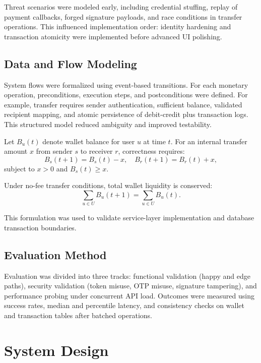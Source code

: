 \documentclass[conference]{IEEEtran}
\begin{document}
Threat scenarios were modeled early, including credential stuffing, replay of payment callbacks, forged signature payloads, and race conditions in transfer operations. This influenced implementation order: identity hardening and transaction atomicity were implemented before advanced UI polishing.

\subsection{Data and Flow Modeling}
System flows were formalized using event-based transitions. For each monetary operation, preconditions, execution steps, and postconditions were defined. For example, transfer requires sender authentication, sufficient balance, validated recipient mapping, and atomic persistence of debit-credit plus transaction logs. This structured model reduced ambiguity and improved testability.

Let $B_u(t)$ denote wallet balance for user $u$ at time $t$. For an internal transfer amount $x$ from sender $s$ to receiver $r$, correctness requires:
\begin{equation}
B_s(t+1) = B_s(t) - x, \quad B_r(t+1) = B_r(t) + x,
\label{eq:transfer_balances}
\end{equation}
subject to $x > 0$ and $B_s(t) \geq x$.

Under no-fee transfer conditions, total wallet liquidity is conserved:
\begin{equation}
\sum_{u \in U} B_u(t+1) = \sum_{u \in U} B_u(t).
\label{eq:conservation}
\end{equation}

This formulation was used to validate service-layer implementation and database transaction boundaries.

\subsection{Evaluation Method}
Evaluation was divided into three tracks: functional validation (happy and edge paths), security validation (token misuse, OTP misuse, signature tampering), and performance probing under concurrent API load. Outcomes were measured using success rates, median and percentile latency, and consistency checks on wallet and transaction tables after batched operations.

\section{System Design}
\end{document}
